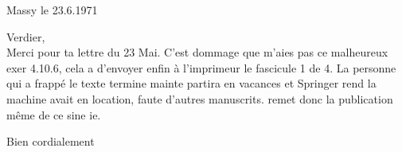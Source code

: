 \begin{flushright}
Massy le 23.6.1971\\
\end{flushright}
 Verdier,\\

Merci pour ta lettre du 23 Mai. C'est dommage que   m'aies pas  ce malheureux exer 4.10.6, cela a  d'envoyer enfin à l'imprimeur le fascicule 1 de  4. La personne qui a frappé le texte termine mainte  partira en vacances et Springer rend la machine  avait en location, faute d'autres manuscrits.  remet donc la publication même de ce  sine ie.

Bien cordialement\\
